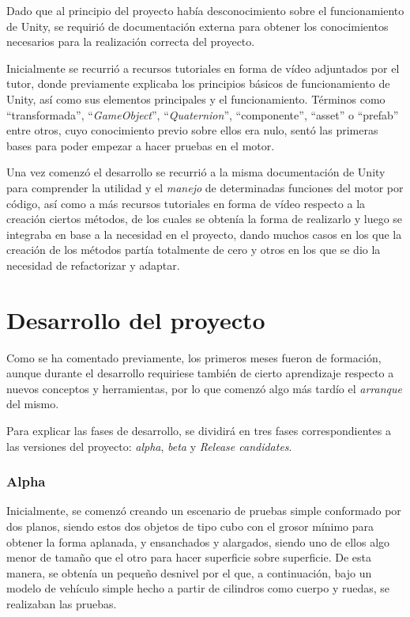 Dado que al principio del proyecto había desconocimiento sobre el funcionamiento de Unity, se requirió de documentación externa para obtener los conocimientos necesarios para la realización correcta del proyecto.

Inicialmente se recurrió a recursos tutoriales en forma de vídeo adjuntados por el tutor, donde previamente explicaba los principios básicos de funcionamiento de Unity, así como sus elementos principales y el funcionamiento. Términos como ``transformada'', ``\textit{GameObject}'', ``\textit{Quaternion}'', ``componente'', ``asset'' o ``prefab'' entre otros, cuyo conocimiento previo sobre ellos era nulo, sentó las primeras bases para poder empezar a hacer pruebas en el motor.

Una vez comenzó el desarrollo se recurrió a la misma documentación de Unity para comprender la utilidad y el \textit{manejo} de determinadas funciones del motor por código, así como a más recursos tutoriales en forma de vídeo respecto a la creación ciertos métodos, de los cuales se obtenía la forma de realizarlo y luego se integraba en base a la necesidad en el proyecto, dando muchos casos en los que la creación de los métodos partía totalmente de cero y otros en los que se dio la necesidad de refactorizar y adaptar.

\section{Desarrollo del proyecto}

Como se ha comentado previamente, los primeros meses fueron de formación, aunque durante el desarrollo requiriese también de cierto aprendizaje respecto a nuevos conceptos y herramientas, por lo que comenzó algo más tardío el \textit{arranque} del mismo.

Para explicar las fases de desarrollo, se dividirá en tres fases correspondientes a las versiones del proyecto: \textit{alpha}, \textit{beta} y \textit{Release candidates}.

\subsubsection{Alpha}

Inicialmente, se comenzó creando un escenario de pruebas simple conformado por dos planos, siendo estos dos objetos de tipo cubo con el grosor mínimo para obtener la forma aplanada, y ensanchados y alargados, siendo uno de ellos algo menor de tamaño que el otro para hacer superficie sobre superficie. De esta manera, se obtenía un pequeño desnivel por el que, a continuación, bajo un modelo de vehículo simple hecho a partir de cilindros como cuerpo y ruedas, se realizaban las pruebas.

